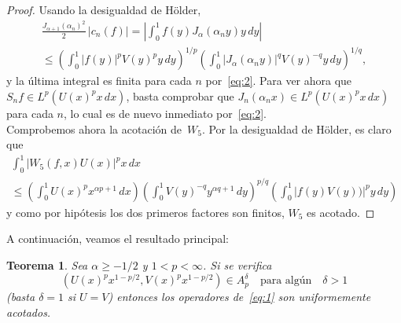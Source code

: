 \documentclass[a4paper]{article}
\newtheorem*{theorem*}{Teorema}
\begin{document}
\begin{proof}
Usando la desigualdad de H\"{o}lder,
\begin{multline*}
  \frac{J_{\alpha+1}(\alpha_{n})^2}{2}\, |c_{n}(f)|
  = \left|\int_{0}^{1} f(y)J_{\alpha}(\alpha_{n}y)y\,dy\right| \\
  \leq \left( \int_{0}^{1} |f(y)|^p V(y)^p y\,dy \right)^{1/p}
  \left( \int_{0}^{1} |J_{\alpha}(\alpha_{n}y)|^{q} V(y)^{-q} y\,dy \right)^{1/q},
\end{multline*}
y la \'ultima integral es finita para cada $n$ por~\eqref{eq:2}. Para ver 
ahora que $S_{n}f \in L^p(U(x)^p x\,dx)$, basta comprobar que 
$J_{n}(\alpha_{n}x) \in L^p(U(x)^p x\,dx)$ para cada $n$, lo 
cual es de nuevo inmediato por~\eqref{eq:2}.\\
Comprobemos ahora la acotaci\'on de~$W_{5}$.
Por la desigualdad de H\"{o}lder, es claro que
\begin{multline*}
 \int_{0}^{1} |W_{5}(f,x)U(x)|^p x\,dx \\
 \leq \left( \int_{0}^{1} U(x)^p x^{\alpha p+1}\,dx \right)
 \left( \int_{0}^{1} V(y)^{-q} y^{\alpha q+1}\,dy \right)^{p/q}
 \left( \int_{0}^{1} |f(y)V(y))|^p y\,dy \right)
\end{multline*}
y como por hip\'otesis los dos primeros factores son finitos, 
$W_{5}$ es acotado.
\end{proof}

A continuaci\'on, veamos el resultado principal:

\begin{theorem*}
Sea $\alpha \geq -1/2$ y $1 < p < \infty$.
Si se verifica
\begin{equation}
\label{eq:6}
  (U(x)^p x^{1-p/2},V(x)^p x^{1-p/2}) \in A_p^{\delta}
  \quad\text{para alg\'un}\quad \delta > 1
\end{equation}
(basta $\delta = 1$ si $U = V$)
entonces los operadores de~\eqref{eq:1} son uniformemente acotados.
\end{theorem*}
\end{document}
